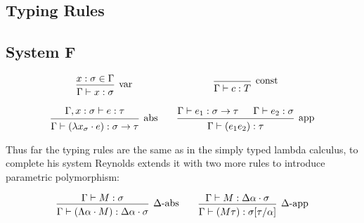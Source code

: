 \begin{appendices}
  
  \section {Typing Rules}

  \subsection {System F}
  \label{appendix:sysFrules}
  \[\begin{array}{c@{\qquad}c}
      \mbox{\begin {prooftree}
        \hypo{x:\sigma \in \Gamma}
        \infer1[var]{\Gamma \vdash x:\sigma}
      \end {prooftree}}
      &
      \mbox{\begin{prooftree}
        \infer0[const]{\Gamma \vdash c:T}
      \end{prooftree}}
      \\\\
      \mbox{\begin{prooftree}
        \hypo{\Gamma, x:\sigma \vdash e : \tau}
        \infer1[abs]{\Gamma \vdash (\lambda x_\sigma \cdot e) : \sigma
          \to \tau}
      \end{prooftree}}
      &
      \mbox{\begin{prooftree}
        \hypo{\Gamma \vdash e_1 : \sigma \to \tau}
        \hypo{\Gamma \vdash e_2 : \sigma}
        \infer2[app]{\Gamma \vdash (e_1 e_2): \tau}
      \end{prooftree}}
      \\
  \end{array} \]

  Thus far the typing rules are the same as in the simply typed lambda
  calculus, to complete his system Reynolds extends it with two more
  rules to introduce parametric polymorphism:

  \[\begin{array}{c@{\qquad}c}  
      \mbox{\begin{prooftree}
        \hypo{\Gamma \vdash M : \sigma}
        \infer1[$\Delta$-abs]{\Gamma \vdash (\Lambda \alpha \cdot M) : \Delta
        \alpha \cdot \sigma}
      \end{prooftree}}
      &
      \mbox{\begin{prooftree}
        \hypo{\Gamma \vdash M : \Delta \alpha \cdot \sigma}
        \infer1[$\Delta$-app]{\Gamma \vdash (M \tau) : \sigma[\tau / \alpha]}
      \end{prooftree}}
      \\\\
    \end{array} \]


\end{appendices}
